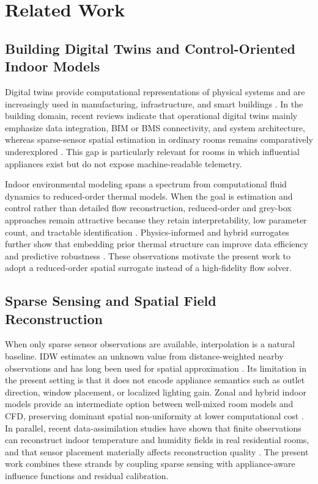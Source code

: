 \documentclass[conference]{IEEEtran}
\begin{document}
\section{Related Work}
\subsection{Building Digital Twins and Control-Oriented Indoor Models}
Digital twins provide computational representations of physical systems and are increasingly used in manufacturing, infrastructure, and smart buildings \cite{tao2019digitaltwin,fuller2020digitaltwin}. In the building domain, recent reviews indicate that operational digital twins mainly emphasize data integration, BIM or BMS connectivity, and system architecture, whereas sparse-sensor spatial estimation in ordinary rooms remains comparatively underexplored \cite{cespedes2024bdtreview}. This gap is particularly relevant for rooms in which influential appliances exist but do not expose machine-readable telemetry.

Indoor environmental modeling spans a spectrum from computational fluid dynamics to reduced-order thermal models. When the goal is estimation and control rather than detailed flow reconstruction, reduced-order and grey-box approaches remain attractive because they retain interpretability, low parameter count, and tractable identification \cite{bacher2011heatdynamics,hietaharju2018dynamicmodel}. Physics-informed and hybrid surrogates further show that embedding prior thermal structure can improve data efficiency and predictive robustness \cite{gokhale2022pinnthermal}. These observations motivate the present work to adopt a reduced-order spatial surrogate instead of a high-fidelity flow solver.

\subsection{Sparse Sensing and Spatial Field Reconstruction}
When only sparse sensor observations are available, interpolation is a natural baseline. IDW estimates an unknown value from distance-weighted nearby observations and has long been used for spatial approximation \cite{shepard1968two}. Its limitation in the present setting is that it does not encode appliance semantics such as outlet direction, window placement, or localized lighting gain. Zonal and hybrid indoor models provide an intermediate option between well-mixed room models and CFD, preserving dominant spatial non-uniformity at lower computational cost \cite{teshome2004zonalreview,megri2022doma,huljak2025hybrid}. In parallel, recent data-assimilation studies have shown that finite observations can reconstruct indoor temperature and humidity fields in real residential rooms, and that sensor placement materially affects reconstruction quality \cite{qian2025dafield,chen2007zonalnetwork}. The present work combines these strands by coupling sparse sensing with appliance-aware influence functions and residual calibration.
\end{document}

